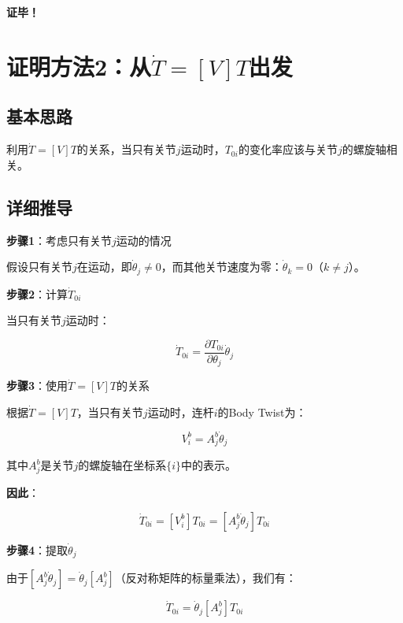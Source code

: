 \documentclass[12pt,a4paper]{article}
\begin{document}
\textbf{证毕！}

\section{证明方法2：从$\dot{T} = [V]T$出发}

\subsection{基本思路}

利用$\dot{T} = [V]T$的关系，当只有关节$j$运动时，$T_{0i}$的变化率应该与关节$j$的螺旋轴相关。

\subsection{详细推导}

\textbf{步骤1}：考虑只有关节$j$运动的情况

假设只有关节$j$在运动，即$\dot{\theta}_j \neq 0$，而其他关节速度为零：$\dot{\theta}_k = 0$（$k \neq j$）。

\textbf{步骤2}：计算$\dot{T}_{0i}$

当只有关节$j$运动时：

\begin{equation}
\dot{T}_{0i} = \frac{\partial T_{0i}}{\partial \theta_j} \dot{\theta}_j
\end{equation}

\textbf{步骤3}：使用$\dot{T} = [V]T$的关系

根据$\dot{T} = [V]T$，当只有关节$j$运动时，连杆$i$的Body Twist为：

\begin{equation}
V_i^b = A_j^b \dot{\theta}_j
\end{equation}

其中$A_j^b$是关节$j$的螺旋轴在坐标系$\{i\}$中的表示。

\textbf{因此}：

\begin{equation}
\dot{T}_{0i} = [V_i^b] T_{0i} = [A_j^b \dot{\theta}_j] T_{0i}
\end{equation}

\textbf{步骤4}：提取$\dot{\theta}_j$

由于$[A_j^b \dot{\theta}_j] = \dot{\theta}_j [A_j^b]$（反对称矩阵的标量乘法），我们有：

\begin{equation}
\dot{T}_{0i} = \dot{\theta}_j [A_j^b] T_{0i}
\end{equation}
\end{document}
